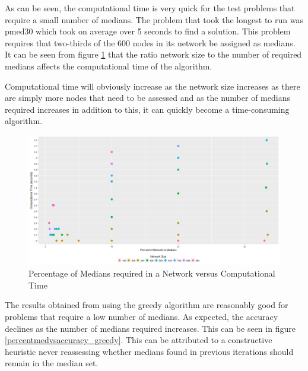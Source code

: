 \documentclass[11pt]{article}
\begin{document}
	As can be seen, the computational time is very quick for the test problems that require a small number of medians.  The problem that took the longest to run was pmed30 which took on average over 5 seconds to find a solution.  This problem requires that two-thirds of the 600 nodes in its network be assigned as medians.  It can be seen from figure \ref{percentmedvstime_greedy} that the ratio network size to the number of required medians affects the computational time of the algorithm.
	
	Computational time will obviously increase as the network size increases as there are simply more nodes that need to be assessed and as the number of medians required increases in addition to this, it can quickly become a time-consuming algorithm.
	
	\begin{figure}[H]
		\begin{center}
			\includegraphics[width=14cm]{percentmedvstime_greedy.png}
			\caption{Percentage of Medians required in a Network versus Computational Time}
			\label{percentmedvstime_greedy}
		\end{center}
	\end{figure}
	
	The results obtained from using the greedy algorithm are reasonably good for problems that require a low number of medians.  As expected, the accuracy declines as the number of medians required increases.  This can be seen in figure \ref{percentmedvsaccuracy_greedy}.  This can be attributed to a constructive heuristic never reassessing whether medians found in previous iterations should remain in the median set.
	
\end{document}
